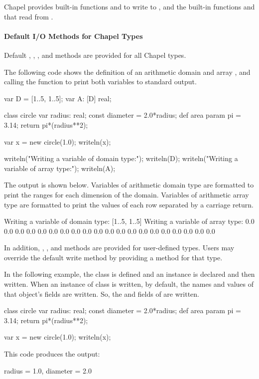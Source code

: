 Chapel provides built-in functions  and 
to write to , and the built-in functions 
and  that read from .

\paragraph{Default I/O Methods for Chapel Types}
Default , , , and  
methods are provided for all Chapel types.  

\begin{example}
The following code shows the definition of an arithmetic domain 
and array , and calling the  function
to print both variables to standard output.  
\begin{chapel}
var D = [1..5, 1..5];
var A: [D] real;

class circle {
  var radius: real;
  const diameter = 2.0*radius;
  def area {
    param pi = 3.14;
    return pi*(radius**2);
  }
}

var x = new circle(1.0);
writeln(x);

writeln("Writing a variable of domain type:");
writeln(D);
writeln("Writing a variable of array type:");
writeln(A);
\end{chapel}

The output is shown below.  Variables of arithmetic domain type are 
formatted to print the ranges for each dimension of the domain.  Variables
of arithmetic array type are formatted to print the values of each row
separated by a carriage return.
\begin{commandline}
Writing a variable of domain type:
[1..5, 1..5]
Writing a variable of array type:
0.0 0.0 0.0 0.0 0.0
0.0 0.0 0.0 0.0 0.0
0.0 0.0 0.0 0.0 0.0
0.0 0.0 0.0 0.0 0.0
\end{commandline}
\end{example}

In addition, , ,  and 
 methods
are provided for user-defined types.  Users may override the default
write method by providing a  method
for that type.

\begin{example}
In the following example, the class  is defined and
an instance  is declared and then written.
When an instance of class is written, by default, the names and values 
of that object's fields are written.  So, the  and
 fields of  are written.

\begin{chapel}
class circle {
  var radius: real;
  const diameter = 2.0*radius;
  def area {
    param pi = 3.14;
    return pi*(radius**2);
  }
}

var x = new circle(1.0);
writeln(x);
\end{chapel}

This code produces the output:
\begin{commandline}
{radius = 1.0, diameter = 2.0}
\end{commandline}
\end{example}

